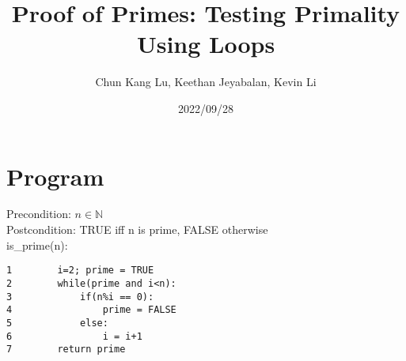 \documentclass{article}
\title{Proof of Primes: Testing Primality Using Loops}
\author{Chun Kang Lu, Keethan Jeyabalan, Kevin Li}
\date{2022/09/28}
\begin{document}
	\maketitle
	\flushleft
	\section*{Program}
	Precondition: \(n\in \mathbb{N} \) \\ 
	Postcondition: TRUE iff n is prime, FALSE otherwise\\
	is\_prime(n): \\
	\begin{verbatim}
1        i=2; prime = TRUE
2        while(prime and i<n):
3            if(n%i == 0):
4                prime = FALSE
5            else:
6                i = i+1
7        return prime
	\end{verbatim}
	
	
\end{document}
